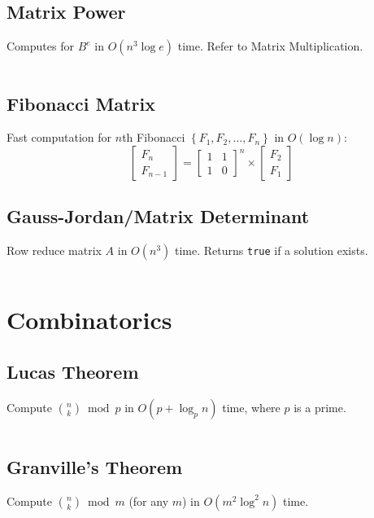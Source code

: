 \documentclass[8pt,a4paper,landscape,oneside]{amsart}
\newcommand{\code}[1]{\inputminted[fontsize=\normalsize,baselinestretch=1]{cpp}{_code/#1}}
\begin{document}
\begin{multicols*}{3}
  \subsection{Matrix Power}
    Computes for $B^e$ in $O(n^3 \log e)$ time. Refer to Matrix Multiplication.
    \code{algebra/matpow.java}
  \subsection{Fibonacci Matrix}
    Fast computation for $n$th Fibonacci $\left\{F_1,F_2,\ldots,F_n \right\}$ in $O(\log n)$:
    \[
    \begin{bmatrix}
        F_n \\
        F_{n-1}
    \end{bmatrix}
    =
    \begin{bmatrix}
        1 & 1 \\
        1 & 0
    \end{bmatrix}^n
    \times
    \begin{bmatrix}
        F_2 \\
        F_1
    \end{bmatrix}
    \]
  \subsection{Gauss-Jordan/Matrix Determinant}
    Row reduce matrix $A$ in $O(n^3)$ time. Returns \texttt{true} if a solution exists.
    \code{algebra/gauss-jordan.java}
\section{Combinatorics}
  \subsection{Lucas Theorem}
    Compute $\binom{n}{k} \bmod{p}$ in $O(p + \log_p n)$ time, where $p$ is a prime.
    \code{combs/lucas.cpp}
  \subsection{Granville's Theorem}
    Compute $\binom{n}{k} \bmod{m}$ (for any $m$) in $O(m^2 \log^2 n)$ time.
    \code{combs/granville.py}

\end{multicols*}
\end{document}
